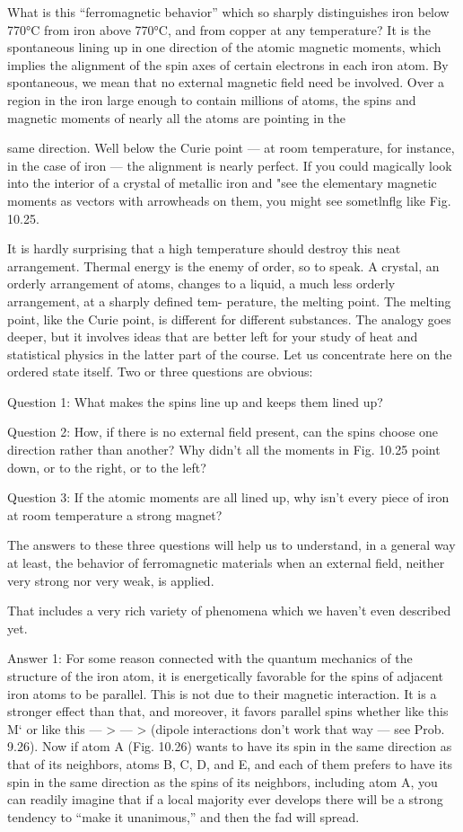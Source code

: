 {What is this ``ferromagnetic behavior'' which so sharply distinguishes
iron below 770°C from iron above 770°C, and from copper
at any temperature? It is the spontaneous lining up in one direction
of the atomic magnetic moments, which implies the alignment of
the spin axes of certain electrons in each iron atom. By spontaneous,
we mean that no external magnetic field need be involved. Over a
region in the iron large enough to contain millions of atoms, the spins
and magnetic moments of nearly all the atoms are pointing in the

 

same direction. Well below the Curie point --- at room temperature,
for instance, in the case of iron --- the alignment is nearly perfect.
If you could magically look into the interior of a crystal of metallic
iron and "see the elementary magnetic moments as vectors with
arrowheads on them, you might see sometlnflg like Fig. 10.25.

It is hardly surprising that a high temperature should destroy this
neat arrangement. Thermal energy is the enemy of order, so
to speak. A crystal, an orderly arrangement of atoms, changes to a
liquid, a much less orderly arrangement, at a sharply defined tem-
perature, the melting point. The melting point, like the Curie point,
is different for different substances. The analogy goes deeper, but it
involves ideas that are better left for your study of heat and statistical
physics in the latter part of the course. Let us concentrate here on
the ordered state itself. Two or three questions are obvious:

Question 1: What makes the spins line up and keeps them lined
up?

Question 2: How, if there is no external field present, can the
spins choose one direction rather than another? Why didn't all the
moments in Fig. 10.25 point down, or to the right, or to the left?

Question 3: If the atomic moments are all lined up, why isn't every
piece of iron at room temperature a strong magnet?

The answers to these three questions will help us to understand,
in a general way at least, the behavior of ferromagnetic materials
when an external field, neither very strong nor very weak, is applied.

That includes a very rich variety of phenomena which we haven't
even described yet.

Answer 1: For some reason connected with the quantum mechanics
of the structure of the iron atom, it is energetically favorable
for the spins of adjacent iron atoms to be parallel. This is not due
to their magnetic interaction. It is a stronger effect than that, and
moreover, it favors parallel spins whether like this M‘ or like this  --- > --- >
(dipole interactions don't work that way --- see Prob. 9.26). Now if
atom A (Fig. 10.26) wants to have its spin in the same direction as
that of its neighbors, atoms B, C, D, and E, and each of them prefers
to have its spin in the same direction as the spins of its neighbors,
including atom A, you can readily imagine that if a local majority
ever develops there will be a strong tendency to ``make it 
unanimous,'' and then the fad will spread.

}
